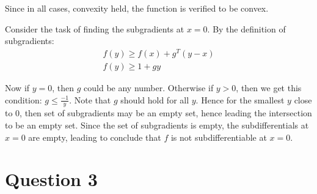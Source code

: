 \documentclass[11pt]{article}
\begin{document}
\begin{flushleft}
Since in all cases, convexity held, the function is verified to be convex.

Consider the task of finding the subgradients at \(x = 0\). By the definition of subgradients:
\begin{gather*}
f(y) \geq f(x) + g^{T}(y - x) \\
f(y) \geq 1 + gy
\end{gather*}

Now if \(y = 0\), then \(g\) could be any number. Otherwise if \(y > 0\), then we get this condition: \(g \leq \frac{-1}{y}\). Note that \(g\) should hold for all \(y\). Hence for the smallest \(y\) close to \(0\), then set of subgradients may be an empty set, hence leading the intersection to be an empty set. Since the set of subgradients is empty, the subdifferentials at \(x = 0\) are empty, leading to conclude that \(f\) is not subdifferentiable at \(x = 0\).
\end{flushleft}

\section*{Question 3}
\end{document}
